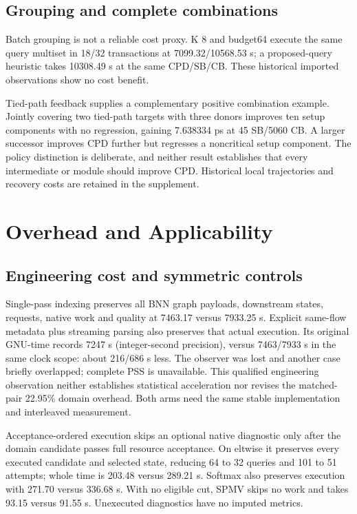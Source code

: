 \documentclass[conference,10pt]{IEEEtran}
\begin{document}
\subsection{Grouping and complete combinations}
Batch grouping is not a reliable cost proxy. K 8 and budget64 execute the same query multiset in 18/32 transactions at 7099.32/10568.53 s; a proposed-query heuristic takes 10308.49 s at the same CPD/SB/CB. These historical imported observations show no cost benefit.

Tied-path feedback supplies a complementary positive combination example. Jointly covering two tied-path targets with three donors improves ten setup components with no regression, gaining 7.638334 ps at 45 SB/5060 CB. A larger successor improves CPD further but regresses a noncritical setup component. The policy distinction is deliberate, and neither result establishes that every intermediate or module should improve CPD. Historical local trajectories and recovery costs are retained in the supplement.
\section{Overhead and Applicability}
\subsection{Engineering cost and symmetric controls}
Single-pass indexing preserves all BNN graph payloads, downstream states, requests, native work and quality at 7463.17 versus 7933.25 s. Explicit same-flow metadata plus streaming parsing also preserves that actual execution. Its original GNU-time records 7247 s (integer-second precision), versus 7463/7933 s in the same clock scope: about 216/686 s less. The observer was lost and another case briefly overlapped; complete PSS is unavailable. This qualified engineering observation neither establishes statistical acceleration nor revises the matched-pair 22.95\% domain overhead. Both arms need the same stable implementation and interleaved measurement.

Acceptance-ordered execution skips an optional native diagnostic only after the domain candidate passes full resource acceptance. On eltwise it preserves every executed candidate and selected state, reducing 64 to 32 queries and 101 to 51 attempts; whole time is 203.48 versus 289.21 s. Softmax also preserves execution with 271.70 versus 336.68 s. With no eligible cut, SPMV skips no work and takes 93.15 versus 91.55 s. Unexecuted diagnostics have no imputed metrics.
\end{document}
